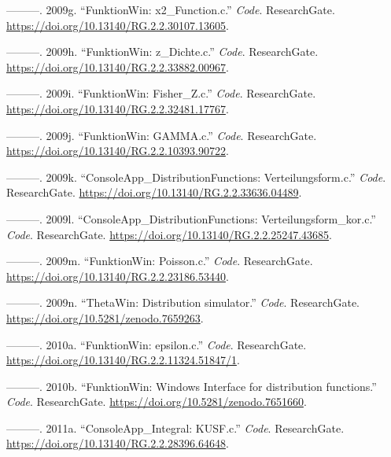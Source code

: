 \documentclass[
]{article}
\newlength{\cslhangindent}
\newlength{\cslentryspacingunit} %
\newenvironment{CSLReferences}[2] %
 {%
  \setlength{\parindent}{0pt}
  \ifodd #1
  \let\oldpar\par
  \def\par{\hangindent=\cslhangindent\oldpar}
  \fi
  \setlength{\parskip}{#2\cslentryspacingunit}
 }%
 {}
\begin{document}
\begin{CSLReferences}{1}{0}
\leavevmode{}%
---------. 2009g. {``{FunktionWin: x2\_Function.c}.''} \emph{Code}.
ResearchGate. \url{https://doi.org/10.13140/RG.2.2.30107.13605}.

\leavevmode{}%
---------. 2009h. {``{FunktionWin: z\_Dichte.c}.''} \emph{Code}.
ResearchGate. \url{https://doi.org/10.13140/RG.2.2.33882.00967}.

\leavevmode{}%
---------. 2009i. {``{FunktionWin: Fisher\_Z.c}.''} \emph{Code}.
ResearchGate. \url{https://doi.org/10.13140/RG.2.2.32481.17767}.

\leavevmode{}%
---------. 2009j. {``{FunktionWin: GAMMA.c}.''} \emph{Code}.
ResearchGate. \url{https://doi.org/10.13140/RG.2.2.10393.90722}.

\leavevmode{}%
---------. 2009k. {``{ConsoleApp\_DistributionFunctions:
Verteilungsform.c}.''} \emph{Code}. ResearchGate.
\url{https://doi.org/10.13140/RG.2.2.33636.04489}.

\leavevmode{}%
---------. 2009l. {``{ConsoleApp\_DistributionFunctions:
Verteilungsform\_kor.c}.''} \emph{Code}. ResearchGate.
\url{https://doi.org/10.13140/RG.2.2.25247.43685}.

\leavevmode{}%
---------. 2009m. {``{FunktionWin: Poisson.c}.''} \emph{Code}.
ResearchGate. \url{https://doi.org/10.13140/RG.2.2.23186.53440}.

\leavevmode{}%
---------. 2009n. {``{ThetaWin: Distribution simulator}.''} \emph{Code}.
ResearchGate. \url{https://doi.org/10.5281/zenodo.7659263}.

\leavevmode{}%
---------. 2010a. {``{FunktionWin: epsilon.c}.''} \emph{Code}.
ResearchGate. \url{https://doi.org/10.13140/RG.2.2.11324.51847/1}.

\leavevmode{}%
---------. 2010b. {``{FunktionWin: Windows Interface for distribution
functions}.''} \emph{Code}. ResearchGate.
\url{https://doi.org/10.5281/zenodo.7651660}.

\leavevmode{}%
---------. 2011a. {``{ConsoleApp\_Integral: KUSF.c}.''} \emph{Code}.
ResearchGate. \url{https://doi.org/10.13140/RG.2.2.28396.64648}.


\end{CSLReferences}
\end{document}
